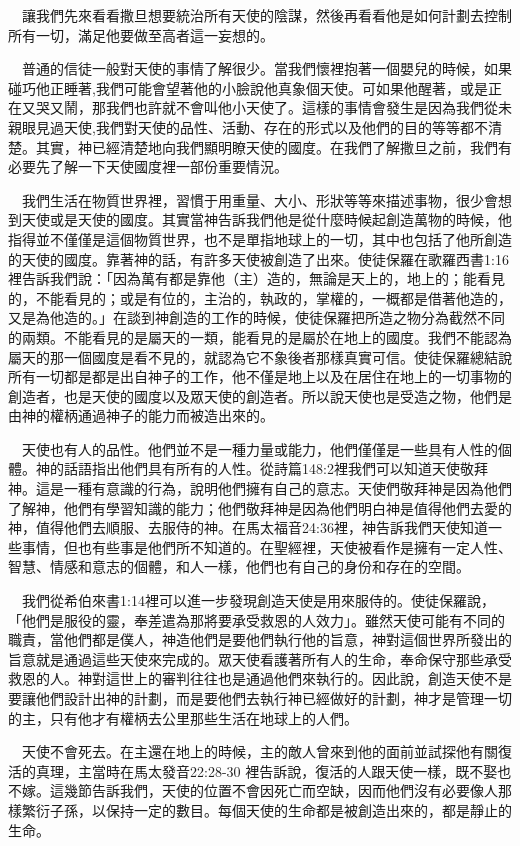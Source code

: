 \documentclass{book}
\begin{document}
　讓我們先來看看撒旦想要統治所有天使的陰謀，然後再看看他是如何計劃去控制所有一切，滿足他要做至高者這一妄想的。

　普通的信徒一般對天使的事情了解很少。當我們懷裡抱著一個嬰兒的時候，如果碰巧他正睡著,我們可能會望著他的小臉說他真象個天使。可如果他醒著，或是正在又哭又鬧，那我們也許就不會叫他小天使了。這樣的事情會發生是因為我們從未親眼見過天使,我們對天使的品性、活動、存在的形式以及他們的目的等等都不清楚。其實，神已經清楚地向我們顯明瞭天使的國度。在我們了解撒旦之前，我們有必要先了解一下天使國度裡一部份重要情況。

　我們生活在物質世界裡，習慣于用重量、大小、形狀等等來描述事物，很少會想到天使或是天使的國度。其實當神告訴我們他是從什麼時候起創造萬物的時候，他指得並不僅僅是這個物質世界，也不是單指地球上的一切，其中也包括了他所創造的天使的國度。靠著神的話，有許多天使被創造了出來。使徒保羅在歌羅西書1:16裡告訴我們說：「因為萬有都是靠他（主）造的，無論是天上的，地上的；能看見的，不能看見的；或是有位的，主治的，執政的，掌權的，一概都是借著他造的，又是為他造的。」在談到神創造的工作的時候，使徒保羅把所造之物分為截然不同的兩類。不能看見的是屬天的一類，能看見的是屬於在地上的國度。我們不能認為屬天的那一個國度是看不見的，就認為它不象後者那樣真實可信。使徒保羅總結說所有一切都是都是出自神子的工作，他不僅是地上以及在居住在地上的一切事物的創造者，也是天使的國度以及眾天使的創造者。所以說天使也是受造之物，他們是由神的權柄通過神子的能力而被造出來的。

　天使也有人的品性。他們並不是一種力量或能力，他們僅僅是一些具有人性的個體。神的話語指出他們具有所有的人性。從詩篇148:2裡我們可以知道天使敬拜神。這是一種有意識的行為，說明他們擁有自己的意志。天使們敬拜神是因為他們了解神，他們有學習知識的能力；他們敬拜神是因為他們明白神是值得他們去愛的神，值得他們去順服、去服侍的神。在馬太福音24:36裡，神告訴我們天使知道一些事情，但也有些事是他們所不知道的。在聖經裡，天使被看作是擁有一定人性、智慧、情感和意志的個體，和人一樣，他們也有自己的身份和存在的空間。

　我們從希伯來書1:14裡可以進一步發現創造天使是用來服侍的。使徒保羅說，「他們是服役的靈，奉差遣為那將要承受救恩的人效力」。雖然天使可能有不同的職責，當他們都是僕人，神造他們是要他們執行他的旨意，神對這個世界所發出的旨意就是通過這些天使來完成的。眾天使看護著所有人的生命，奉命保守那些承受救恩的人。神對這世上的審判往往也是通過他們來執行的。因此說，創造天使不是要讓他們設計出神的計劃，而是要他們去執行神已經做好的計劃，神才是管理一切的主，只有他才有權柄去公里那些生活在地球上的人們。

　天使不會死去。在主還在地上的時候，主的敵人曾來到他的面前並試探他有關復活的真理，主當時在馬太發音22:28-30 裡告訴說，復活的人跟天使一樣，既不娶也不嫁。這幾節告訴我們，天使的位置不會因死亡而空缺，因而他們沒有必要像人那樣繁衍子孫，以保持一定的數目。每個天使的生命都是被創造出來的，都是靜止的生命。
\end{document}
